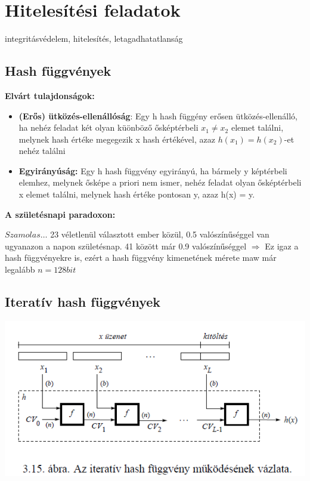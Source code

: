 \section{Hitelesítési feladatok}
integritásvédelem, hitelesítés, letagadhatatlanság

\subsection{Hash függvények}
\textbf{Elvárt tulajdonságok:}
	\begin{itemize}
		\item \textbf{(Erős) ütközés-ellenállóság}: Egy h hash függény erősen ütközés-ellenálló, ha nehéz feladat két olyan küönböző ősképtérbeli $x_1 \neq x_2$ elemet találni, melynek hash értéke megegezik x hash értékével, azaz $ h(x_1) = h(x_2)$-et nehéz találni
		\item \textbf{Egyirányúság:} Egy h hash függvény egyirányú, ha bármely y képtérbeli elemhez, melynek ősképe a priori nem ismer, nehéz feladat olyan ősképtérbeli x elemet találni, melynek hash értéke pontosan y, azaz h(x) = y.
	\end{itemize}

\textbf{A születésnapi paradoxon:}

$Szamolas \ldots$ 23 véletlenül választott ember közül, 0.5 valószínűséggel van ugyanazon a napon születésnap. 41 között már 0.9 valószínűséggel $\Longrightarrow$ Ez igaz a hash függvényekre is, ezért a hash függvény kimenetének mérete maw már legalább $n = 128 bit$

\subsection{Iteratív hash függvények}

\begin{center}
	\includegraphics[scale=0.7]{img/ITHASH}
\end{center}

